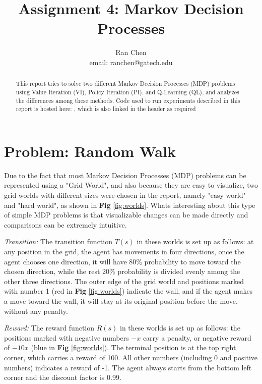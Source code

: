 \documentclass[10pt]{article}
\author{Ran Chen \\ email: ranchen@gatech.edu\vspace{-2ex}}
\title{\vspace{-1.8cm}Assignment 4: Markov Decision Processes}
\date{}
\begin{document}
\maketitle
\thispagestyle{fancy}


\begin{abstract}
This report tries to solve two different Markov Decision Processes (MDP) problems using Value Iteration (VI), Policy Iteration (PI), and Q-Learning (QL), and analyzes the differences among these methods. Code used to run experiments described in this report is hosted here: , which is also linked in the header as required
\end{abstract}

\section{Problem: Random Walk} \label{problem}

Due to the fact that most Markov Decision Processes (MDP) problems can be represented using a "Grid World", and also because they are easy to visualize, two grid worlds with different sizes were chosen in the report, namely "easy world" and "hard world", as shown in \textbf{Fig} \ref{fig:worlds}. Whats interesting about this type of simple MDP problems is that visualizable changes can be made directly and comparisons can be extremely intuitive.\par
\bigbreak
\noindent
\textit{Transition:} The transition function $T(s)$ in these worlds is set up as follows: at any position in the grid, the agent has movements in four directions, once the agent chooses one direction, it will have 80\% probability to move toward the chosen direction, while the rest 20\% probability is divided evenly among the other three directions. The outer edge of the grid world and positions marked with number 1 (red in \textbf{Fig} \ref{fig:worlds}) indicate the wall, and if the agent makes a move toward the wall, it will stay at its original position before the move, without any penalty. \par
\bigbreak
\noindent
\textit{Reward:} The reward function $R(s)$ in these worlds is set up as follows: the positions marked with negative numbers $-x$ carry a penalty, or negative reward of $-10x$ (blue in \textbf{Fig} \ref{fig:worlds}). The terminal position is at the top right corner, which carries a reward of 100. All other numbers (including 0 and positive numbers) indicates a reward of -1. The agent always starts from the bottom left corner and the discount factor is 0.99.
\end{document}
